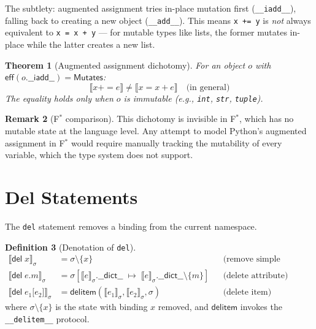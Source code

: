 \documentclass[11pt,a4paper]{report}
\theoremstyle{definition}
\newtheorem{definition}{Definition}[chapter]
\newtheorem{remark}[definition]{Remark}
\theoremstyle{plain}
\newtheorem{theorem}[definition]{Theorem}
\newcommand{\den}[1]{\llbracket #1 \rrbracket}
\newcommand{\Mutates}{\mathsf{Mutates}}
\newcommand{\fstar}{F$^{*}$}
\begin{document}
The subtlety: augmented assignment tries in-place mutation first
(\lstinline[style=python]{__iadd__}), falling back to creating a new object
(\lstinline[style=python]{__add__}).  This means \lstinline[style=python]{x += y}
is \emph{not} always equivalent to \lstinline[style=python]{x = x + y} ---
for mutable types like lists, the former mutates in-place while the latter
creates a new list.

\begin{theorem}[Augmented assignment dichotomy]
For an object $o$ with $\mathsf{eff}(o.\mathsf{\_\_iadd\_\_}) = \Mutates$:
\[
  \den{x \mathbin{+}= e} \neq \den{x = x + e}
  \quad\text{(in general)}
\]
The equality holds only when $o$ is immutable (e.g., \texttt{int}, \texttt{str},
\texttt{tuple}).
\end{theorem}

\begin{remark}[\fstar{} comparison]
This dichotomy is invisible in \fstar{}, which has no mutable state at the
language level.  Any attempt to model Python's augmented assignment in \fstar{}
would require manually tracking the mutability of every variable, which the
type system does not support.
\end{remark}


\section{Del Statements}

The \lstinline[style=python]{del} statement removes a binding from the
current namespace.

\begin{definition}[Denotation of \texttt{del}]
\begin{align}
  \den{\mathsf{del}\;x}_\sigma
    &= \sigma \setminus \{x\}
    && \text{(remove simple variable)} \\
  \den{\mathsf{del}\;e\texttt{.}m}_\sigma
    &= \sigma\!\left[\den{e}_\sigma.\mathsf{\_\_dict\_\_} \;\mapsto\;
       \den{e}_\sigma.\mathsf{\_\_dict\_\_} \setminus \{m\}\right]
    && \text{(delete attribute)} \\
  \den{\mathsf{del}\;e_1\texttt{[}e_2\texttt{]}}_\sigma
    &= \mathsf{delitem}(\den{e_1}_\sigma, \den{e_2}_\sigma, \sigma)
    && \text{(delete item)}
\end{align}
where $\sigma \setminus \{x\}$ is the state with binding $x$ removed, and
$\mathsf{delitem}$ invokes the \lstinline[style=python]{__delitem__} protocol.
\end{definition}
\end{document}

